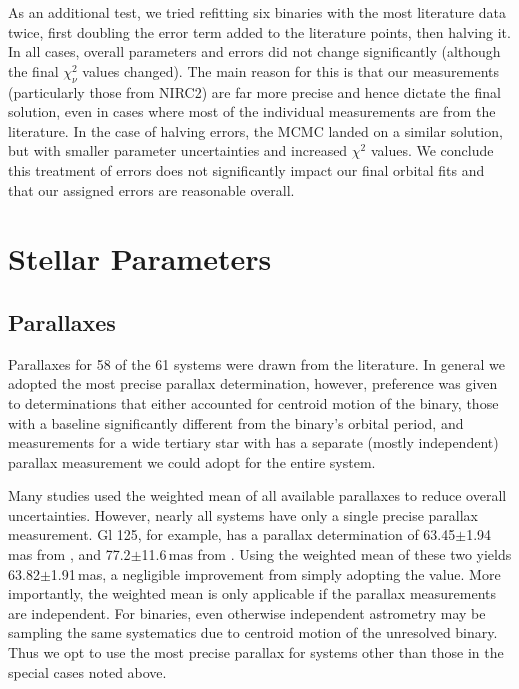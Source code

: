 \documentclass[twocolumn]{aastex62}
\begin{document}
As an additional test, we tried refitting six binaries with the most literature data twice, first doubling the error term added to the literature points, then halving it. In all cases, overall parameters and errors did not change significantly (although the final $\chi^2_\nu$ values changed). The main reason for this is that our measurements (particularly those from NIRC2) are far more precise and hence dictate the final solution, even in cases where most of the individual measurements are from the literature. In the case of halving errors, the MCMC landed on a similar solution, but with smaller parameter uncertainties and increased $\chi^2$ values. We conclude this treatment of errors does not significantly impact our final orbital fits and that our assigned errors are reasonable overall.

\section{Stellar Parameters}\label{sec:params}

\subsection{Parallaxes}\label{sec:plx}

Parallaxes for 58 of the 61 systems were drawn from the literature. In general we adopted the most precise parallax determination, however, preference was given to determinations that either accounted for centroid motion of the binary, those with a baseline significantly different from the binary's orbital period, and measurements for a wide tertiary star with has a separate (mostly independent) parallax measurement we could adopt for the entire system. 

Many studies used the weighted mean of all available parallaxes \citep[e.g.,][]{Winters2015} to reduce overall uncertainties. However, nearly all systems have only a single precise parallax measurement. Gl 125, for example, has a parallax determination of 63.45$\pm$1.94\,mas from \citet{van-Leeuwen:2007yq}, and 77.2$\pm$11.6\,mas from \citet{van-Altena1995}. Using the weighted mean of these two yields 63.82$\pm$1.91\,mas, a negligible improvement from simply adopting the \citet{van-Leeuwen:2007yq} value. More importantly, the weighted mean is only applicable if the parallax measurements are independent. For binaries, even otherwise independent astrometry may be sampling the same systematics due to centroid motion of the unresolved binary. Thus we opt to use the most precise parallax for systems other than those in the special cases noted above.  
\end{document}
